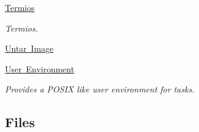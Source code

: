 \begin{DoxyCompactItemize}
\mbox{\hyperlink{group__Termios}{Termios}}
\begin{DoxyCompactList}\small\item\em Termios. \end{DoxyCompactList}\item 
\mbox{\hyperlink{group__libmisc__untar__img}{Untar Image}}
\item 
\mbox{\hyperlink{group__LibIOEnv}{User Environment}}
\begin{DoxyCompactList}\small\item\em Provides a P\+O\+S\+IX like user environment for tasks. \end{DoxyCompactList}\end{DoxyCompactItemize}
\subsection*{Files}
